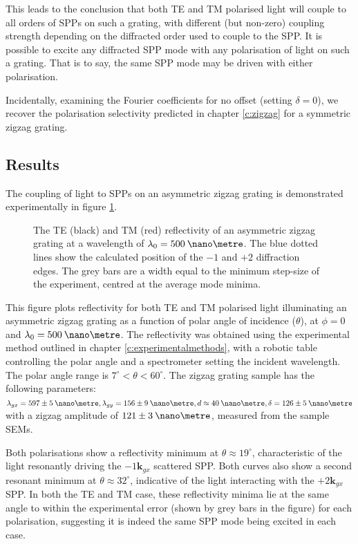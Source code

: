 This leads to the conclusion that both TE and TM polarised light will couple to all orders of SPPs on such a grating, with different (but non-zero) coupling strength depending on the diffracted order used to couple to the SPP. It is possible to excite any diffracted SPP mode with any polarisation of light on such a grating. That is to say, the same SPP mode may be driven with either polarisation.

Incidentally, examining the Fourier coefficients for no offset (setting $\delta=0$), we recover the polarisation selectivity predicted in chapter \ref{c:zigzag} for a symmetric zigzag grating. 

\subsection{Results}
The coupling of light to SPPs on an asymmetric zigzag grating is demonstrated experimentally in figure \ref{fig:azz-teandtmR}.
\begin{figure}
\begin{center}

\end{center}
\caption[The TE and TM reflectivity as a function of polar angle for an asymmetric zigzag grating illuminated with a wavelength of $\lambda_0=500\:\nano\metre$.]{The TE (black) and TM (\color{red}red\color{black}) reflectivity of an asymmetric zigzag grating at a wavelength of $\lambda_0=500\:\nano\metre$. The blue dotted lines show the calculated position of the $-1$ and $+2$ diffraction edges. The grey bars are a width equal to the minimum step-size of the experiment, centred at the average mode minima.\label{fig:azz-teandtmR}}
\end{figure}
This figure plots reflectivity for both TE and TM polarised light illuminating an asymmetric zigzag grating as a function of polar angle of incidence ($\theta$), at $\phi =0$ and $\lambda_0=500 \:\nano\metre$. The reflectivity was obtained using the experimental method outlined in chapter \ref{c:experimentalmethods}, with a robotic table controlling the polar angle and a spectrometer setting the incident wavelength. The polar angle range is $7^\circ<\theta<60^\circ$. The zigzag grating sample has the following parameters:  $\lambda_{gx}=597\pm 5\:\nano\metre, \lambda_{gy}=156\pm 9\:\nano\metre, d\approx 40\:\nano\metre, \delta=126\pm 5\:\nano\metre$ with a zigzag amplitude of $121\pm 3\:\nano\metre$, measured from the sample SEMs.

Both polarisations show a reflectivity minimum at $\theta\approx 19^\circ$, characteristic of the light resonantly driving the $-1\mathbf{k}_{gx}$ scattered SPP. Both curves also show a second resonant minimum at $\theta\approx 32^\circ$, indicative of the light interacting with the $+2\mathbf{k}_{gx}$ SPP. In both the TE and TM case, these reflectivity minima lie at the same angle to within the experimental error (shown by grey bars in the figure) for each polarisation, suggesting it is indeed the same SPP mode being excited in each case.

